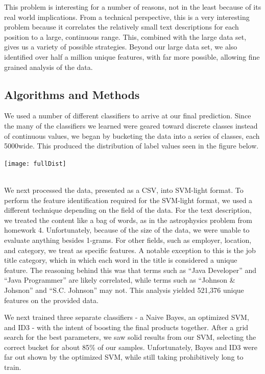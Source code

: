 \documentclass{pset}
\begin{document}
This problem is interesting for a number of reasons, not in the least because
of its real world implications. From a technical perspective, this is a very
interesting problem because it correlates the relatively small text
descriptions for each position to a large, continuous range. This, combined
with the large data set, gives us a variety of possible strategies. Beyond our
large data set, we also identified over half a million unique features, with
far more possible, allowing fine grained analysis of the data.

\subsection{Algorithms and Methods}
We used a number of different classifiers to arrive at our final prediction.
Since the many of the classifiers we learned were geared toward discrete
classes instead of continuous values, we began by bucketing the data into a
series of classes, each 5000\textsterling wide. This produced the distribution
of label values seen in the figure below.\\
\centerline{\texttt{[image: fullDist]}}\\

We next processed the data, presented as a CSV, into SVM-light format. To
perform the feature identification required for the SVM-light format, we used a
different technique depending on the field of the data. For the text
description, we treated the content like a bag of words, as in the astrophysics
problem from homework 4. Unfortunately, because of the size of the data, we
were unable to evaluate anything besides 1-grams. For other fields, such as
employer, location, and category, we treat as specific features.  A notable
exception to this is the job title category, which in which each word in the
title is considered a unique feature. The reasoning behind this was that terms
such as ``Java Developer'' and ``Java Programmer'' are likely correlated, while
terms such as ``Johnson \& Johsnon'' and ``S.C. Johnson'' may not. This analysis
yielded 521,376 unique features on the provided data.

We next trained three separate classifiers - a Naive Bayes, an optimized SVM,
and ID3 - with the intent of boosting the final products together. After a grid
search for the best parameters, we saw solid results from our SVM, selecting
the correct bucket for about 85\% of our samples. Unfortunately, Bayes and ID3
were far out shown by the optimized SVM, while still taking prohibitively long
to train. 
 
\end{document}
